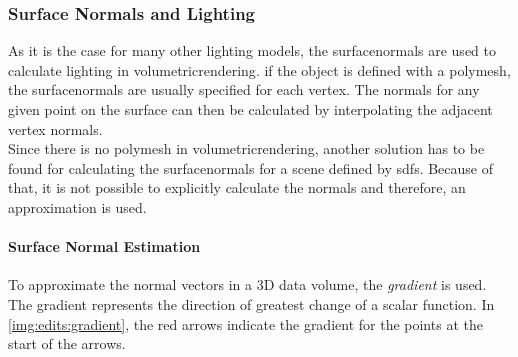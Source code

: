 \subsubsection{Surface Normals and Lighting}
As it is the case for many other lighting models, the \gls{surfacenormal}s are used to calculate lighting in \gls{volumetricrendering}. 
if the object is defined with a \gls{polymesh}, the \gls{surfacenormal}s are usually specified for each vertex. The normals for any given point on the surface can then be calculated by interpolating the adjacent vertex normals. 
\\
Since there is no \gls{polymesh} in \gls{volumetricrendering}, another solution has to be found for calculating the \gls{surfacenormal}s for a scene defined by \gls{sdf}s.
Because of that, it is not possible to explicitly calculate the normals and therefore, an approximation is used. 

\paragraph{Surface Normal Estimation}
To approximate the normal vectors in a 3D data volume, the \textit{\gls{gradient}} is used. The \gls{gradient} represents the direction of greatest change of a scalar function.
In \autoref{img:edits:gradient}, the red arrows indicate the gradient for the points at the start of the arrows. 

